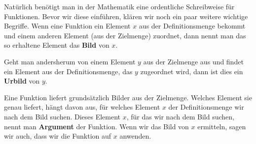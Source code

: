 \documentclass[../../main.tex]{subfiles}
\begin{document}

Natürlich benötigt man in der Mathematik eine ordentliche Schreibweise für Funktionen. Bevor wir diese einführen, klären wir noch ein paar weitere wichtige Begriffe. Wenn eine Funktion ein Element $x$ aus der Definitionsmenge bekommt und einem anderen Element (aus der Zielmenge) zuordnet, dann nennt man das so erhaltene Element das \textbf{Bild} von $x$.

Geht man andersherum von einem Element $y$ aus der Zielmenge aus und findet ein Element aus der Definitionsmenge, das $y$ zugeordnet wird, dann ist dies ein \textbf{Urbild} von $y$.

Eine Funktion liefert grundsätzlich Bilder aus der Zielmenge. Welches Element sie genau liefert, hängt davon aus, für welches Element $x$ der Definitionsmenge wir nach dem Bild suchen. Dieses Element $x$, für das wir nach dem Bild suchen, nennt man \textbf{Argument} der Funktion. Wenn wir das Bild von $x$ ermitteln, sagen wir auch, dass wir die Funktion auf $x$ anwenden.
\end{document}
